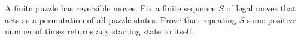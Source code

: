A finite puzzle has reversible moves. Fix a finite sequence $S$ of legal moves that acts as a permutation of all puzzle states. Prove that repeating $S$ some positive number of times returns any starting state to itself.
